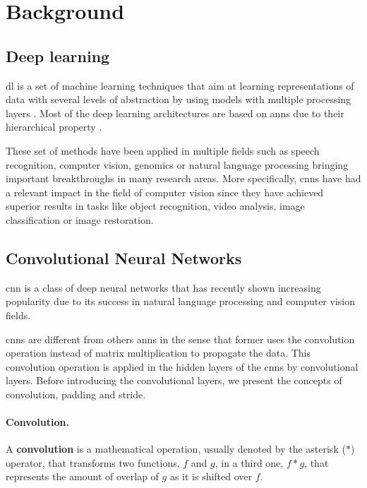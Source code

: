 \section{Background}\label{sec:background}

\subsection{Deep learning}
\gls{dl} is a set of machine learning techniques that aim at learning representations of data with several levels of abstraction by using models with multiple processing layers \cite{DL2}. Most of the deep learning architectures are based on \glspl{ann} due to their hierarchical property \cite{DL1} \cite{DBLP:DEEPSISR}.

These set of methods have been applied in multiple fields such as speech recognition, computer vision, genomics or natural language processing bringing important breakthroughs in many research areas. More specifically, \glspl{cnn} have had a relevant impact in the field of computer vision since they have achieved superior results in tasks like object recognition, video analysis, image classification or image restoration.

\subsection{Convolutional Neural Networks}
\gls{cnn} is a class of deep neural networks that has recently shown increasing popularity due to its success in natural language processing and computer vision fields.

\glspl{cnn} are different from others \glspl{ann} in the sense that former uses the convolution operation instead of matrix multiplication to propagate the data. This convolution operation is applied in the hidden layers of the \glspl{cnn} by convolutional layers. Before introducing the convolutional layers, we present the concepts of convolution, padding and stride.

\paragraph{Convolution.} 

A \textbf{convolution} is a mathematical operation, usually denoted by the asterisk ($\ast$) operator, that transforms two functions, $f$ and $g$, in a third one, $f\ast g$, that represents the amount of overlap of $g$ as it is shifted over $f$.

